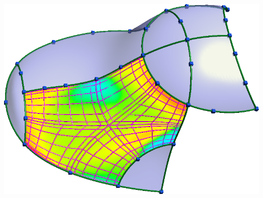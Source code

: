 \documentclass[xcolor=table]{beamer}
\begin{document}
\begin{frame}
\begin{columns}
    \includegraphics[height=.4\textheight]{images/slides/split.png}
  \end{columns}
\end{frame}
\end{document}
